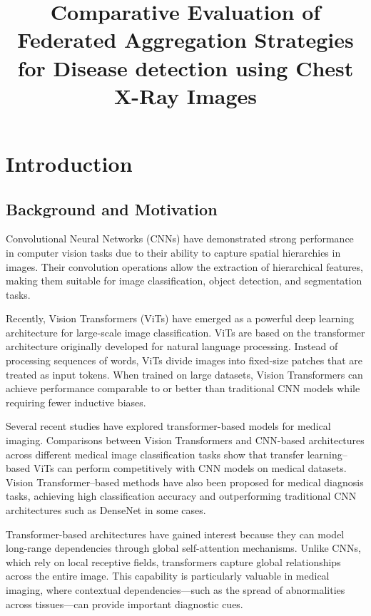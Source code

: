 \documentclass[12pt]{book}
\title{Comparative Evaluation of Federated Aggregation Strategies for Disease detection using Chest X-Ray Images}
\date{}
\begin{document}
\maketitle
\tableofcontents

\chapter{Introduction}

\section{Background and Motivation}

Convolutional Neural Networks (CNNs) have demonstrated strong performance in computer vision tasks due to their ability to capture spatial hierarchies in images. Their convolution operations allow the extraction of hierarchical features, making them suitable for image classification, object detection, and segmentation tasks.

Recently, Vision Transformers (ViTs) have emerged as a powerful deep learning architecture for large-scale image classification. ViTs are based on the transformer architecture originally developed for natural language processing. Instead of processing sequences of words, ViTs divide images into fixed-size patches that are treated as input tokens. When trained on large datasets, Vision Transformers can achieve performance comparable to or better than traditional CNN models while requiring fewer inductive biases.

Several recent studies have explored transformer-based models for medical imaging. Comparisons between Vision Transformers and CNN-based architectures across different medical image classification tasks show that transfer learning–based ViTs can perform competitively with CNN models on medical datasets. Vision Transformer–based methods have also been proposed for medical diagnosis tasks, achieving high classification accuracy and outperforming traditional CNN architectures such as DenseNet in some cases.

Transformer-based architectures have gained interest because they can model long-range dependencies through global self-attention mechanisms. Unlike CNNs, which rely on local receptive fields, transformers capture global relationships across the entire image. This capability is particularly valuable in medical imaging, where contextual dependencies—such as the spread of abnormalities across tissues—can provide important diagnostic cues.
\end{document}
